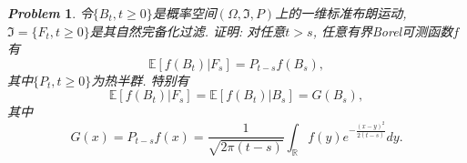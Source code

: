 \documentclass{article}
\newtheorem{problem}{\itshape Problem}
\newcommand{\E}[1]{\mathbb{E}\left[#1\right]}
\begin{document}
	\begin{problem}
		令$\{B_t,t\ge 0\}$是概率空间$(\Omega, \mathfrak{I}, P)$上的一维标准布朗运动, $\mathfrak{I} = \{F_t, t\ge 0\}$是其自然完备化过滤. 证明: 对任意$t>s$, 任意有界Borel可测函数$f$有
		\begin{equation*}
  			\E{f(B_t)|F_s} = P_{t-s}f(B_s),
		\end{equation*}
		其中$\{P_t,t\ge 0\}$为热半群. 特别有
		\begin{equation*}
			\E{f(B_t)|F_s} =  \E{f(B_t)|B_s} = G(B_s),
		\end{equation*}
		其中
		\begin{equation*}
			G(x)=P_{t-s} f(x)=\frac{1}{\sqrt{2 \pi(t-s)}} \int_\mathbb{R} f(y) e^{-\frac{(x-y)^2}{2(t-s)}} d y.
		\end{equation*}
	\end{problem}
\end{document}
